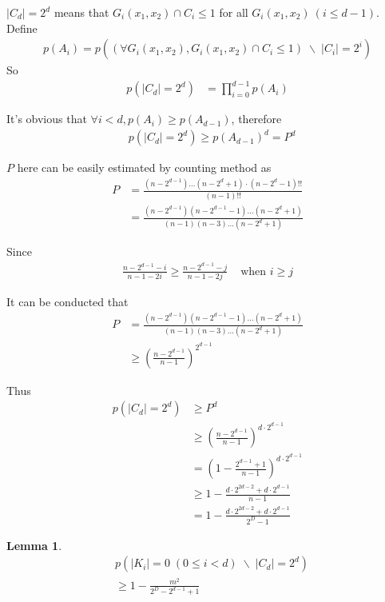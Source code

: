 \documentclass[10pt, conference, compsocconf]{IEEEtran}
\newtheorem{mylemma}{Lemma}
\begin{document}
		\begin{IEEEproof}
			$|C_d| = 2^d$ means that $G_i(x_1, x_2) \cap C_i \leq 1$
			for all $G_i(x_1, x_2)~(i \leq d-1)$. Define
			\begin{align*}
				p(A_i) = p\left((\forall G_i(x_1, x_2), G_i(x_1, x_2) \cap C_i \leq 1)
					 \; \backslash \; |C_i| = 2^i\right)
			\end{align*}
			So
			\begin{align*}
				p(|C_d| = 2^d) &= \prod_{i=0}^{d-1} p(A_i)
			\end{align*}
			
			It's obvious that $\forall i < d, p(A_i) \geq p(A_{d-1})$, therefore
			\begin{align*}
				&p(|C_d| = 2^d) 
				\geq p(A_{d-1})^d
				= P^d
			\end{align*}
			
			$P$ here can be easily estimated by counting method as
			\begin{align*}
				P &= \frac{(n-2^{d-1})\ldots(n-2^d+1)\cdot (n-2^d-1)!!}{(n-1)!!}\\
					&= \frac{(n-2^{d-1})(n-2^{d-1}-1)\ldots (n-2^d+1)}{(n-1)(n-3)\ldots(n-2^d+1)}
			\end{align*}
			
			Since
			\begin{align*}
				\frac{n-2^{d-1}-i}{n-1-2i} \geq \frac{n-2^{d-1}-j}{n-1-2j} & \text{ when } i \geq j
			\end{align*}
			
			It can be conducted that
			\begin{align*}
				P &= \frac{(n-2^{d-1})(n-2^{d-1}-1)\ldots (n-2^d+1)}{(n-1)(n-3)\ldots(n-2^d+1)}\\
					&\geq (\frac{n-2^{d-1}}{n-1})^{2^{d-1}}
			\end{align*}
			
			Thus
			\begin{align*}
			p(|C_d| = 2^d) &\geq P^d\\
				&\geq (\frac{n-2^{d-1}}{n-1})^{d \cdot 2^{d-1}}\\
				&= (1-\frac{2^{d-1}+1}{n-1})^{d \cdot 2^{d-1}}\\
				&\geq 1-\frac{d \cdot 2^{2d-2}+d \cdot 2^{d-1}}{n-1}\\
				&= 1-\frac{d \cdot 2^{2d-2}+d \cdot 2^{d-1}}{2^D-1}
			\end{align*}
		\end{IEEEproof}
		
		\begin{mylemma}
			\begin{align*}
			&p(|K_i| = 0	\; (0 \leq i < d) \; \backslash \; |C_d| = 2^d) \\
				&\geq 1-\frac{m^2}{2^D-2^{d-1}+1}
			\end{align*}
		\end{mylemma}
		
\end{document}
